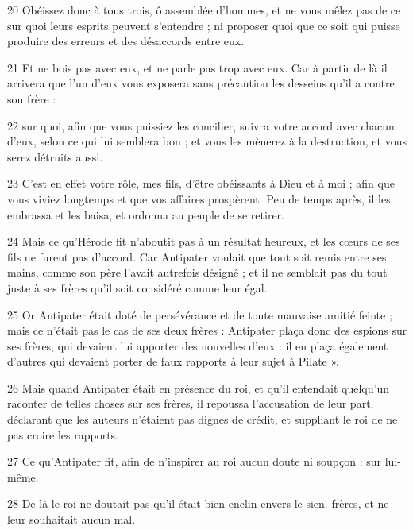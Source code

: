 \par 20 Obéissez donc à tous trois, ô assemblée d'hommes, et ne vous mêlez pas de ce sur quoi leurs esprits peuvent s'entendre ; ni proposer quoi que ce soit qui puisse produire des erreurs et des désaccords entre eux.

\par 21 Et ne bois pas avec eux, et ne parle pas trop avec eux. Car à partir de là il arrivera que l’un d’eux vous exposera sans précaution les desseins qu’il a contre son frère :

\par 22 sur quoi, afin que vous puissiez les concilier, suivra votre accord avec chacun d'eux, selon ce qui lui semblera bon ; et vous les mènerez à la destruction, et vous serez détruits aussi.

\par 23 C'est en effet votre rôle, mes fils, d'être obéissants à Dieu et à moi ; afin que vous viviez longtemps et que vos affaires prospèrent. Peu de temps après, il les embrassa et les baisa, et ordonna au peuple de se retirer.

\par 24 Mais ce qu'Hérode fit n'aboutit pas à un résultat heureux, et les cœurs de ses fils ne furent pas d'accord. Car Antipater voulait que tout soit remis entre ses mains, comme son père l'avait autrefois désigné ; et il ne semblait pas du tout juste à ses frères qu'il soit considéré comme leur égal.

\par 25 Or Antipater était doté de persévérance et de toute mauvaise amitié feinte ; mais ce n'était pas le cas de ses deux frères : Antipater plaça donc des espions sur ses frères, qui devaient lui apporter des nouvelles d'eux : il en plaça également d'autres qui devaient porter de faux rapports à leur sujet à Pilate ».

\par 26 Mais quand Antipater était en présence du roi, et qu'il entendait quelqu'un raconter de telles choses sur ses frères, il repoussa l'accusation de leur part, déclarant que les auteurs n'étaient pas dignes de crédit, et suppliant le roi de ne pas croire les rapports.

\par 27 Ce qu'Antipater fit, afin de n'inspirer au roi aucun doute ni soupçon : sur lui-même.

\par 28 De là le roi ne doutait pas qu'il était bien enclin envers le sien. frères, et ne leur souhaitait aucun mal.

